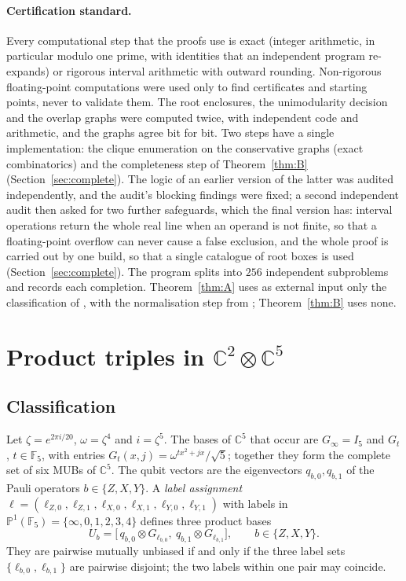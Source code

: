 \documentclass[11pt]{article}
\theoremstyle{definition}
\theoremstyle{remark}
\newcommand{\C}{\mathbb{C}}
\newcommand{\F}{\mathbb{F}}
\newcommand{\PP}{\mathbb{P}}
\begin{document}
\paragraph{Certification standard.} Every computational step that the proofs use is exact (integer arithmetic, in
particular modulo one prime, with identities that an independent program re-expands) or rigorous interval arithmetic
with outward rounding. Non-rigorous floating-point computations were used only to find certificates and starting
points, never to validate them. The root enclosures, the unimodularity decision and the overlap graphs were computed
twice, with independent code and arithmetic, and the graphs agree bit for bit. Two steps have a single implementation:
the clique enumeration on the conservative graphs (exact combinatorics) and the completeness step of
Theorem~\ref{thm:B} (Section~\ref{sec:complete}). The logic of an earlier version of the latter was audited
independently, and the audit's blocking findings were fixed; a second independent audit then asked for two further
safeguards, which the final version has: interval operations return the whole real line when an operand is not
finite, so that a floating-point overflow can never cause a false exclusion, and the whole proof is carried out by
one build, so that a single catalogue of root boxes is used (Section~\ref{sec:complete}). The program splits into
$256$ independent subproblems and records each completion. Theorem~\ref{thm:A} uses as external input only the
classification of \cite{MPW2016}, with the normalisation step from \cite{BWB2010}; Theorem~\ref{thm:B} uses none.

\section{\texorpdfstring{Product triples in $\C^2\otimes\C^5$}{Product triples in C2 x C5}}\label{sec:A}

\subsection{Classification}
Let $\zeta=e^{2\pi i/20}$, $\omega=\zeta^4$ and $i=\zeta^5$. The bases of $\C^5$ that occur are $G_\infty=I_5$ and
$G_t$, $t\in\F_5$, with entries $G_t(x,j)=\omega^{tx^2+jx}/\sqrt5$; together they form the complete set of six MUBs of
$\C^5$. The qubit vectors are the eigenvectors $q_{b,0},q_{b,1}$ of the Pauli operators $b\in\{Z,X,Y\}$. A
\emph{label assignment} $\ell=(\ell_{Z,0},\ell_{Z,1},\ell_{X,0},\ell_{X,1},\ell_{Y,0},\ell_{Y,1})$ with labels in
$\PP^1(\F_5)=\{\infty,0,1,2,3,4\}$ defines three product bases
\begin{equation}\label{eq:U}
U_b=\bigl[\,q_{b,0}\otimes G_{\ell_{b,0}},\ q_{b,1}\otimes G_{\ell_{b,1}}\bigr],\qquad b\in\{Z,X,Y\}.
\end{equation}
They are pairwise mutually unbiased if and only if the three label sets $\{\ell_{b,0},\ell_{b,1}\}$ are pairwise
disjoint; the two labels within one pair may coincide.
\end{document}

